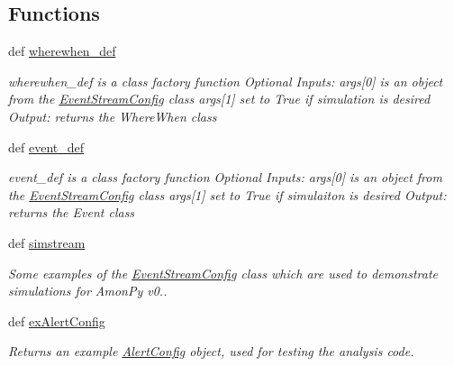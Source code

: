 \subsection*{Functions}
\begin{DoxyCompactItemize}
\item 
def \hyperlink{namespaceamonpy_1_1dbase_1_1db__classes_a17d82764a82f5d4057aa427d04a745cd}{wherewhen\-\_\-def}
\begin{DoxyCompactList}\small\item\em wherewhen\-\_\-def is a class factory function Optional Inputs\-: args\mbox{[}0\mbox{]} is an object from the \hyperlink{classamonpy_1_1dbase_1_1db__classes_1_1_event_stream_config}{Event\-Stream\-Config} class args\mbox{[}1\mbox{]} set to True if simulation is desired Output\-: returns the Where\-When class \end{DoxyCompactList}\item 
def \hyperlink{namespaceamonpy_1_1dbase_1_1db__classes_a6d7088f9593d82867532ef736e26f2f7}{event\-\_\-def}
\begin{DoxyCompactList}\small\item\em event\-\_\-def is a class factory function Optional Inputs\-: args\mbox{[}0\mbox{]} is an object from the \hyperlink{classamonpy_1_1dbase_1_1db__classes_1_1_event_stream_config}{Event\-Stream\-Config} class args\mbox{[}1\mbox{]} set to True if simulaiton is desired Output\-: returns the Event class \end{DoxyCompactList}\item 
def \hyperlink{namespaceamonpy_1_1dbase_1_1db__classes_a5ac6184a9ebdc45d52f961dd4e2ae1fd}{simstream}
\begin{DoxyCompactList}\small\item\em Some examples of the \hyperlink{classamonpy_1_1dbase_1_1db__classes_1_1_event_stream_config}{Event\-Stream\-Config} class which are used to demonstrate simulations for Amon\-Py v0.. \end{DoxyCompactList}\item 
def \hyperlink{namespaceamonpy_1_1dbase_1_1db__classes_a06a8874ab6b9b555ec11356861fb94a2}{ex\-Alert\-Config}
\begin{DoxyCompactList}\small\item\em Returns an example \hyperlink{classamonpy_1_1dbase_1_1db__classes_1_1_alert_config}{Alert\-Config} object, used for testing the analysis code. \end{DoxyCompactList}\end{DoxyCompactItemize}
